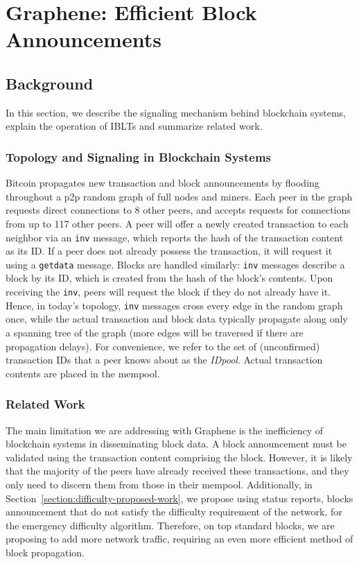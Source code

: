 \chapter{Graphene: Efficient Block Announcements}
\label{graphene}

\section{Background}
In this section, we describe the signaling mechanism behind blockchain systems, explain the operation of IBLTs and summarize related work.

\subsection{Topology and Signaling in Blockchain Systems} 
Bitcoin propagates new transaction and
block announcements by flooding throughout a p2p random graph of full
nodes and miners. Each peer in the graph requests direct connections
to 8 other peers, and accepts requests for connections from up to 117
other peers. A peer will offer a newly created transaction to each
neighbor via an {\tt inv} message, which reports the hash of the
transaction content as its ID. If a peer does not already possess the
transaction, it will request it using a {\tt getdata} message. Blocks
are handled similarly: {\tt inv} messages describe a block by its ID, which
is created from the hash of the block's contents.  Upon receiving the
{\tt inv}, peers will request the block if they do not already have it.
Hence, in today's topology, {\tt inv} messages cross every edge in the
random graph once, while the actual transaction and block data
typically propagate along only a spanning tree of the graph (more
edges will be traversed if there are propagation delays).  For
convenience, we refer to the set of (unconfirmed)
transaction IDs that a peer knows about as the {\em IDpool}. Actual
transaction contents are placed in the mempool.

\subsection{Related Work} 
The main limitation we are addressing with Graphene is the inefficiency of blockchain systems in disseminating block data.  A block announcement
must be validated using  the transaction content comprising the block.  However, it is likely that the majority of the
peers have already received these transactions, and they only
need to discern them from those in their
mempool. Additionally, in Section~\ref{section:difficulty-proposed-work}, we propose using status reports, blocks announcement that do not satisfy the difficulty requirement of the network, for the emergency difficulty algorithm. Therefore, on top standard blocks, we are proposing to add more network traffic, requiring an even more efficient method of block propagation.

